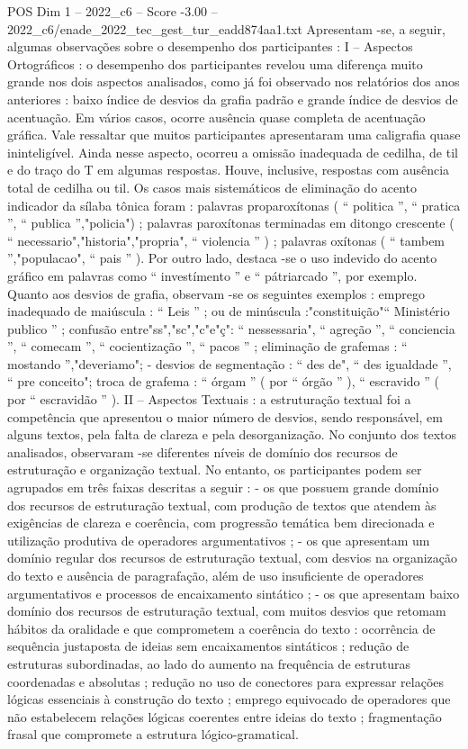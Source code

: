 \begin{textsample}{POS Dim 1 – 2022\_c6 – Score -3.00 – 2022\_c6/enade\_2022\_tec\_gest\_tur\_eadd874aa1.txt}
Apresentam -se, a seguir, algumas observações sobre o desempenho dos participantes : I – Aspectos Ortográficos : o desempenho dos participantes revelou uma diferença muito grande nos dois aspectos analisados, como já foi observado nos relatórios dos anos anteriores : baixo índice de desvios da grafia padrão e grande índice de desvios de acentuação.
Em vários casos, ocorre ausência quase completa de acentuação gráfica.
Vale ressaltar que muitos participantes apresentaram uma caligrafia quase ininteligível.
Ainda nesse aspecto, ocorreu a omissão inadequada de cedilha, de til e do traço do T em algumas respostas.
Houve, inclusive, respostas com ausência total de cedilha ou til.
Os casos mais sistemáticos de eliminação do acento indicador da sílaba tônica foram : palavras proparoxítonas ( “ politica ”, “ pratica ”, “ publica ”,"policia") ; palavras paroxítonas terminadas em ditongo crescente ( “ necessario","historia","propria", “ violencia ” ) ; palavras oxítonas ( “ tambem ”,"populacao", “ pais ” ).
Por outro lado, destaca -se o uso indevido do acento gráfico em palavras como “ investímento ” e “ pátriarcado ”, por exemplo.
Quanto aos desvios de grafia, observam -se os seguintes exemplos : emprego inadequado de maiúscula : “ Leis ” ; ou de minúscula :"constituição"“ Ministério publico ” ; confusão entre"ss","sc","c"e"ç": “ nessessaria", “ agreção ”, “ conciencia ”, “ comecam ”, “ cocientização ”, “ pacos ” ; eliminação de grafemas : “ mostando ”,"deveriamo"; - desvios de segmentação : “ des de", “ des igualdade ”, “ pre conceito"; troca de grafema : “ órgam ” ( por “ órgão ” ), “ escravido ” ( por “ escravidão ” ).
II – Aspectos Textuais : a estruturação textual foi a competência que apresentou o maior número de desvios, sendo responsável, em alguns textos, pela falta de clareza e pela desorganização.
No conjunto dos textos analisados, observaram -se diferentes níveis de domínio dos recursos de estruturação e organização textual.
No entanto, os participantes podem ser agrupados em três faixas descritas a seguir : - os que possuem grande domínio dos recursos de estruturação textual, com produção de textos que atendem às exigências de clareza e coerência, com progressão temática bem direcionada e utilização produtiva de operadores argumentativos ; - os que apresentam um domínio regular dos recursos de estruturação textual, com desvios na organização do texto e ausência de paragrafação, além de uso insuficiente de operadores argumentativos e processos de encaixamento sintático ; - os que apresentam baixo domínio dos recursos de estruturação textual, com muitos desvios que retomam hábitos da oralidade e que comprometem a coerência do texto : ocorrência de sequência justaposta de ideias sem encaixamentos sintáticos ; redução de estruturas subordinadas, ao lado do aumento na frequência de estruturas coordenadas e absolutas ; redução no uso de conectores para expressar relações lógicas essenciais à construção do texto ; emprego equivocado de operadores que não estabelecem relações lógicas coerentes entre ideias do texto ; fragmentação frasal que compromete a estrutura lógico-gramatical.

\end{textsample}
